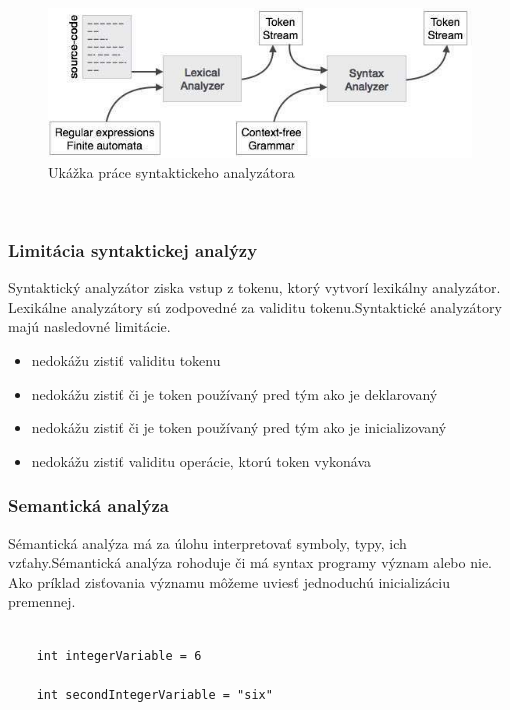  \newline
  \newline
\begin{figure}[!htbp]
	\centering
	\includegraphics[width=15cm]{img/syntax_analyzer.jpg}
	\caption{Ukážka práce syntaktickeho  analyzátora}
	\label{fig:test}
\end{figure}
 \newline
 \newpage
\subsubsection{Limitácia syntaktickej analýzy}
\indent Syntaktický analyzátor ziska vstup z tokenu, ktorý vytvorí lexikálny analyzátor. Lexikálne analyzátory sú zodpovedné za validitu tokenu.Syntaktické analyzátory majú nasledovné limitácie.

\begin{itemize}
	\item nedokážu zistiť validitu tokenu
	\item nedokážu zistiť či je token používaný pred tým ako je deklarovaný
	\item nedokážu zistiť či je token používaný pred tým ako je inicializovaný
	\item nedokážu zistiť validitu operácie, ktorú token vykonáva
\end{itemize}



\subsubsection{Semantická  analýza}
\indent Sémantická analýza má za úlohu interpretovať symboly, typy, ich vzťahy.Sémantická analýza rohoduje či má syntax programy význam alebo nie.
Ako príklad zisťovania významu môžeme uviesť jednoduchú inicializáciu premennej.\cite{gram}

\begin{lstlisting}

	int integerVariable = 6

	int secondIntegerVariable = "six"
\end{lstlisting}

